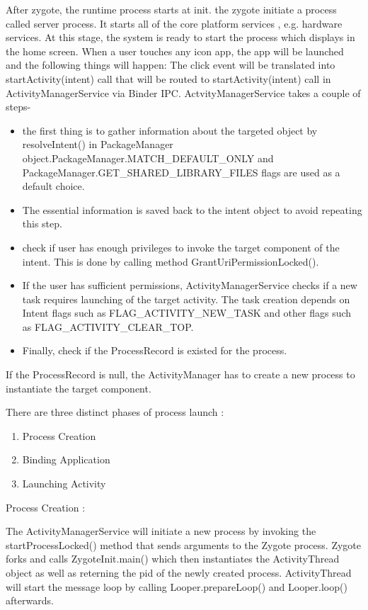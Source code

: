 \documentclass[preprint,12pt]{elsarticle}
\begin{document}
    
After zygote, the runtime process starts at init.  the zygote initiate  a process called server process. It starts all of the core platform services , e.g. hardware services. At this stage, the system is ready to start the process which displays in the home screen. When a user touches any icon app, the app will be launched and the following things will happen: The click event will be translated into startActivity(intent) call that will be routed to startActivity(intent) call in ActivityManagerService via Binder IPC. ActvityManagerService takes a couple of steps-
\begin{itemize}
\item  the first thing is to gather information about the targeted object by resolveIntent() in PackageManager object.PackageManager.MATCH\_DEFAULT\_ONLY and PackageManager.GET\_SHARED\_LIBRARY\_FILES flags are used as a default choice.
\item The essential information is saved back to the intent object to avoid repeating this step.
\item check if user has enough privileges to invoke the target component of the intent. This is done by calling method GrantUriPermissionLocked(). 
\item If the user has sufficient permissions, ActivityManagerService checks if a new task requires launching of the target activity. The task creation depends on Intent flags such as FLAG\_ACTIVITY\_NEW\_TASK and other flags such as FLAG\_ACTIVITY\_CLEAR\_TOP.
\item  Finally, check if the ProcessRecord is existed  for the process.
\end{itemize}
 
If the ProcessRecord is null, the ActivityManager has to create a new process to instantiate the target component.

There are three distinct phases of process launch :
\begin{enumerate}
\item Process Creation
\item Binding Application
\item Launching Activity 
\end{enumerate}
Process Creation :

The ActivityManagerService will initiate a new process by invoking the startProcessLocked() method that sends arguments to the Zygote process. Zygote forks and calls ZygoteInit.main() which then instantiates the ActivityThread object as well as reterning the pid of the newly created process. 
ActivityThread will start the message loop by calling Looper.prepareLoop() and Looper.loop() afterwards.
\end{document}
